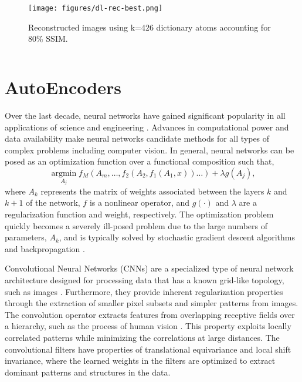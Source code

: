 \documentclass[a4paper,fleqn,12pt]{article}
\begin{document}
\begin{figure}[H]
    \centering
    \texttt{[image: figures/dl-rec-best.png]}
    \caption{Reconstructed images using k=426 dictionary atoms accounting for 80\% SSIM.}
    \label{fig:dl-rec-best}
\end{figure}

\inputminted[frame=lines, framesep=2mm, baselinestretch=1.2, 
             bgcolor=LightGray, fontsize=\footnotesize, linenos]
{python}{codes/dl.py}


\pagebreak
\section*{AutoEncoders}
Over the last decade, neural networks have gained significant popularity in all applications of science and engineering \cite{goodfellow2016deep, zhang2022application}. Advances in computational power and data availability make neural networks candidate methods for all types of complex problems including computer vision. In general, neural networks can be posed as an optimization function over a functional composition such that,
\begin{equation}
    \operatorname*{argmin}_{A_j} f_M (A_m, \dots, f_2(A_2, f_1(A_1, x))\dots)+\lambda g(A_j) ,
\end{equation}
where $A_k$ represents the matrix of weights associated between the layers $k$ and $k+1$ of the network, $f$ is a nonlinear operator, and $g(\cdot)$ and $\lambda$ are a regularization function and weight, respectively. The optimization problem quickly becomes a severely ill-posed problem due to the large numbers of parameters, $A_k$, and is typically solved by stochastic gradient descent algorithms and backpropagation \cite{bottou1991stochastic}. 

Convolutional Neural Networks (CNNs) are a specialized type of neural network architecture designed for processing data that has a known grid-like topology, such as images \cite{li2021survey}. Furthermore, they provide inherent regularization properties through the extraction of smaller pixel subsets and simpler patterns from images. The convolution operator extracts features from overlapping receptive fields over a hierarchy, such as the process of human vision \cite{luo2016understanding}. This property exploits locally correlated patterns while minimizing the correlations at large distances. The convolutional filters have properties of translational equivariance and local shift invariance, where the learned weights in the filters are optimized to extract dominant patterns and structures in the data. 
\end{document}
